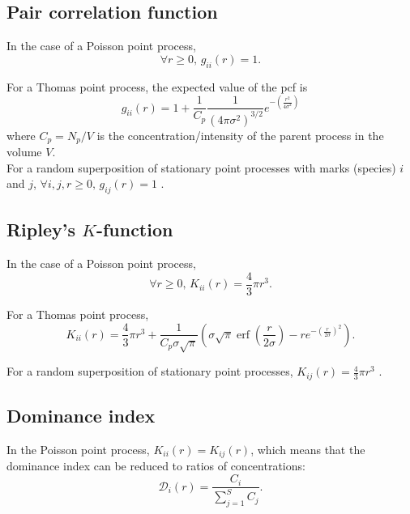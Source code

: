 \documentclass[english]{article}
\DeclareMathOperator\erf{erf}
\begin{document}
\subsection{Pair correlation function}

In the case of a Poisson point process,
\begin{equation}
\forall r\geq0\text{, }g_{ii}(r)=1.
\end{equation}

For a Thomas point process, the expected value of the pcf is
\begin{equation}
g_{ii}(r)=1+\frac{1}{C_{p}}\frac{1}{\left(4\pi\sigma^{2}\right)^{3/2}}e^{-\left(\frac{r^{2}}{4\sigma^{2}}\right)}
\end{equation}
where $C_{p}=N_{p}/V$ is the concentration/intensity of the parent
process in the volume $V$.\\

For a random superposition of stationary point processes with marks
(species) $i$ and $j$, $\forall i,j,r\geq0\text{, }g_{ij}(r)=1$
\citep[ p. 326, eq. 5.3.13]{illian2008statistical}.

\subsection{Ripley's $K$-function}

In the case of a Poisson point process,
\begin{equation}
\forall r\geq0\text{, }K_{ii}(r)=\frac{4}{3}\pi r^{3}.\label{eq:k_poisson}
\end{equation}

For a Thomas point process,
\begin{equation}
K_{ii}(r)=\frac{4}{3}\pi r^{3}+\frac{1}{C_{p}\sigma\sqrt{\pi}}\left(\sigma\sqrt{\pi}\erf\left(\frac{r}{2\sigma}\right)-re^{-\left(\frac{r}{2\sigma}\right)^{2}}\right).\label{eq:k_thomas}
\end{equation}

For a random superposition of stationary point processes, $K_{ij}(r)=\frac{4}{3}\pi r^{3}$
\citep[p. 324, eq. 5.3.5]{illian2008statistical}.

\subsection{Dominance index}

In the Poisson point process, $K_{ii}(r)=K_{ij}(r)$, which means
that the dominance index can be reduced to ratios of concentrations:
\begin{equation}
\mathcal{D}_{i}(r)=\frac{C_{i}}{\sum_{j=1}^{S}C_{j}}.
\end{equation}
\end{document}
